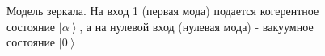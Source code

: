 \begin{figure}
\centering



\caption{Модель зеркала. На вход 1 (первая мода) подается 
когерентное состояние $\left|\alpha\right>$, а на нулевой вход
(нулевая мода) - вакуумное состояние $\left|0\right>$}
\label{figPart2Interfero_3}
\end{figure}
